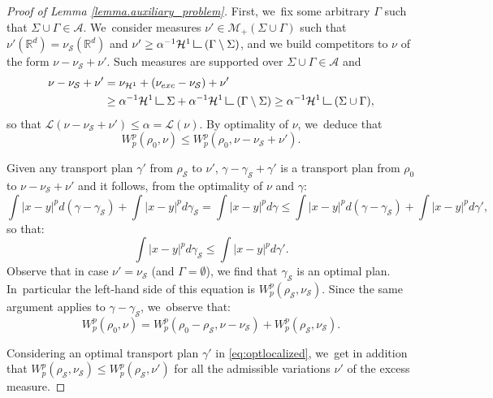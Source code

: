 \documentclass[11pt]{article}
\numberwithin{equation}{section}
\theoremstyle{definition}
\newcommand\LM[1]{\hbox{\vrule width.5pt \vbox to#1pt{\vfill \hrule width#1pt height.5pt}}}
\newcommand\LL{{\mathchoice {\>\LM7\>}{\>\LM7\>}{\,\LM5\,}{\,\LM{3.35}\,}}}
\newcommand{\mres}{\LL}
\newcommand\cH{\mathcal{H}}
\newcommand\cL{\mathcal{L}}
\newcommand{\RR}{\mathbb{R}}
\newcommand{\nuexc}{\nu_{\textup{exc}}}
\newcommand{\nuH}{\nu_{\cH^1}}
\begin{document}
\begin{proof}[Proof of Lemma \ref{lemma.auxiliary_problem}]
First, we~fix some arbitrary $\Gamma$ such that $\Sigma \cup \Gamma \in \mathcal{A}$. We~consider measures $\nu' \in \mathcal{M}_+(\Sigma\cup \Gamma)$ such that $\nu'(\RR^d) = \nu_{\mathcal{S}}(\RR^d)$ and $\nu' \ge \alpha^{-1}\mathcal{H}^1\mres (\Gamma\setminus \Sigma)$, and we build competitors to $\nu$ of the form $\nu - \nu_{\mathcal{S}} + \nu'$. Such measures are supported over $\Sigma \cup \Gamma \in \mathcal{A}$ and
\begin{align*}
\nu - \nu_{\mathcal{S}} + \nu'
&=
\nuH + (\nuexc - \nu_{\mathcal{S}}) + \nu'\\
&\ge
\alpha^{-1}\cH^1\mres \Sigma + \alpha^{-1}\cH^1\mres (\Gamma\setminus \Sigma)
\ge \alpha^{-1}\cH^1\mres (\Sigma \cup \Gamma),
\end{align*}
so that $\cL(\nu - \nu_{\mathcal{S}} + \nu') \le \alpha =\cL(\nu)$. By optimality of $\nu$, we~deduce that
\begin{equation*}
W_p^p(\rho_0, \nu) \le W_p^p(\rho_0, \nu - \nu_{\mathcal{S}} + \nu').
\end{equation*}

Given any transport plan $\gamma'$ from
$\rho_{\mathcal{S}}$ to $\nu'$, $\gamma-\gamma_{\mathcal{S}}+\gamma'$
is a transport plan from $\rho_0$ to $\nu - \nu_{\mathcal{S}} + \nu'$
and it follows, from the optimality of $\nu$ and $\gamma$:
\[
\int |x-y|^p d(\gamma-\gamma_{\mathcal S}) + \int |x-y|^p d\gamma_{\mathcal S} = \int |x-y|^p d\gamma
\le
\int |x-y|^p d(\gamma-\gamma_{\mathcal S}) + \int |x-y|^p d\gamma',
\]
so that:
\begin{equation}\label{eq:optlocalized}
\int |x-y|^p d\gamma_{\mathcal S}\le \int |x-y|^p d\gamma'.
\end{equation}
Observe that in case $\nu'=\nu_{\mathcal{S}}$ (and $\Gamma=\emptyset$),
we find that
$\gamma_{\mathcal{S}}$ is an optimal plan.
In~particular the left-hand side of this equation
is $W_p^p(\rho_{\mathcal{S}}, \nu_{\mathcal{S}})$.
Since the same argument applies to $\gamma-\gamma_{\mathcal{S}}$, we~observe
that:
\begin{equation}\label{rhoexc_decomposition_finer}
W_p^p(\rho_0, \nu)
=
W_p^p\left(\rho_0 - \rho_{\mathcal{S}}, \nu -\nu_{\mathcal{S}}\right)
+ W_p^p(\rho_{\mathcal{S}},\nu_{\mathcal{S}}).
\end{equation}

Considering an optimal transport plan $\gamma'$ in
\eqref{eq:optlocalized}, we~get in addition that $W_p^p\left(\rho_{\mathcal{S}}, \nu_{\mathcal{S}}\right) \le W_p^p\left(\rho_{\mathcal{S}}, \nu'\right)$
for all the admissible variations $\nu'$ of the excess measure.


\end{proof}
\end{document}
